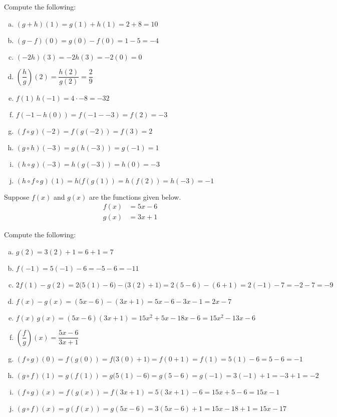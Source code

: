 \documentclass[11pt,letterpaper]{article}
\begin{document}
Compute the following: \pspace
        \begin{enumerate}[(a)]
        \item $(g + h)(1)= g(1) + h(1)= 2 + 8= 10$ \vfill
        \item $(g - f)(0)= g(0) - f(0)= 1 - 5= -4$ \vfill
        \item $(-2h)(3)= -2h(3)= -2(0)= 0$ \vfill
        \item $\left(\dfrac{h}{g}\right)(2)= \dfrac{h(2)}{g(2)}= \dfrac{2}{9}$ \vfill
        \item $f(1)\, h(-1)= 4 \cdot -8= -32$ \vfill
        \item $f(-1 - h(0))= f(-1 - -3)= f(2)= -3$ \vfill
        \item $(f \circ g)(-2)= f(g(-2))= f(3)= 2$ \vfill
	\item $(g \circ h)(-3)= g(h(-3))= g(-1)= 1$ \vfill
        \item $(h \circ g)(-3)= h(g(-3))= h(0)= -3$ \vfill
	\item $(h \circ f \circ g)(1)= h(f(g(1))= h(f(2))= h(-3)= -1$ \vfill
        \end{enumerate} 



\newpage



 Suppose $f(x)$ and $g(x)$ are the functions given below. 
	\[
	\begin{aligned}
	f(x)&= 5x - 6 \\[0.3cm]
	g(x)&= 3x + 1
	\end{aligned}
	\]

Compute the following: \pspace
        \begin{enumerate}[(a)]
        \item $g(2)= 3(2) + 1= 6 + 1= 7$ \vfill
        \item $f(-1)= 5(-1) - 6= -5 - 6= -11$ \vfill
        \item $2f(1) - g(2)= 2 \big( 5(1) - 6 \big) - \big( 3(2) + 1 \big)= 2(5 - 6) - (6 + 1)= 2(-1) - 7= -2 - 7= -9$ \vfill
        \item $f(x) - g(x)= (5x - 6) - (3x + 1)= 5x - 6 - 3x - 1= 2x - 7$ \vfill
        \item $f(x) \, g(x)= (5x - 6)(3x + 1)= 15x^2 + 5x - 18x - 6= 15x^2 - 13x - 6$ \vfill
        \item $\left( \dfrac{f}{g} \right)(x)= \dfrac{5x - 6}{3x + 1}$ \vfill
        \item $(f \circ g)(0)= f(g(0))= f\big( 3(0) + 1 \big)= f(0 + 1)= f(1)= 5(1) - 6= 5 - 6= -1$ \vfill
        \item $(g \circ f)(1)= g(f(1))= g\big( 5(1) - 6 \big)= g(5 - 6)= g(-1)= 3(-1) + 1= -3 + 1= -2$ \vfill
        \item $(f \circ g)(x)= f(g(x))= f(3x + 1)= 5(3x + 1) - 6= 15x + 5 - 6= 15x - 1$ \vfill
        \item $(g \circ f)(x)= g(f(x))= g(5x - 6)= 3(5x - 6) + 1= 15x - 18 + 1= 15x - 17$ \vfill
        \end{enumerate} 
\end{document}
